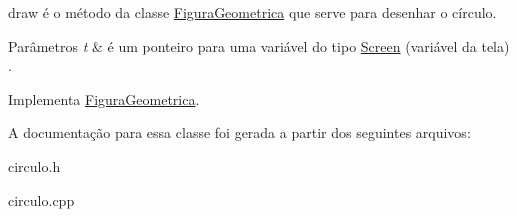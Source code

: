 draw é o método da classe \mbox{\hyperlink{class_figura_geometrica}{Figura\+Geometrica}} que serve para desenhar o círculo. 


\begin{DoxyParams}{Parâmetros}
{\em t} & é um ponteiro para uma variável do tipo \mbox{\hyperlink{class_screen}{Screen}} (variável da tela) . \\
\hline
\end{DoxyParams}


Implementa \mbox{\hyperlink{class_figura_geometrica_a8ee8dedc060b6059a805ea091aef2c41}{Figura\+Geometrica}}.



A documentação para essa classe foi gerada a partir dos seguintes arquivos\+:\begin{DoxyCompactItemize}
\item 
circulo.\+h\item 
circulo.\+cpp\end{DoxyCompactItemize}
